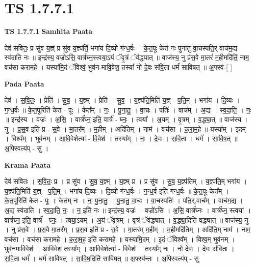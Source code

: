 \documentclass[17pt]{extarticle}
\begin{document}
\section*{ TS 1.7.7.1 }

\textbf{TS 1.7.7.1 } \newline
\textbf{Samhita Paata} \newline

देव॑ सवितः॒ प्र सु॑व य॒ज्ञ्ं प्र सु॑व य॒ज्ञ्प॑तिं॒ भगा॑य दि॒व्यो ग॑न्ध॒र्वः । के॒त॒पूः केतं॑ नः पुनातु वा॒चस्पति॒र् वाच॑म॒द्य स्व॑दाति नः ॥ इन्द्र॑स्य॒ वज्रो॑ऽसि॒ वार्त्र॑घ्न॒स्त्वया॒ऽयं ॅवृ॒त्रं ॅव॑द्ध्यात् ॥ वाज॑स्य॒ नु प्र॑स॒वे मा॒तरं॑ म॒हीमदि॑तिं॒ नाम॒ वच॑सा करामहे । यस्या॑मि॒दं ॅविश्वं॒ भुव॑न-मावि॒वेश॒ तस्यां᳚ नो दे॒वः स॑वि॒ता धर्म॑ साविषत् ॥ अ॒फ्स्व॑-[ ] \newline

\textbf{Pada Paata} \newline

देव॑ । स॒वि॒तः॒ । प्रेति॑ । सु॒व॒ । य॒ज्ञ्म् । प्रेति॑ । सु॒व॒ । य॒ज्ञ्प॑ति॒मिति॑ य॒ज्ञ् - प॒ति॒म् । भगा॑य । दि॒व्यः । ग॒न्ध॒र्वः ॥ के॒त॒पूरिति॑ केत - पूः । केत᳚म् । नः॒ । पु॒ना॒तु॒ । वा॒चः । पतिः॑ । वाच᳚म् । अ॒द्य । स्व॒दा॒ति॒ । नः॒ ॥ इन्द्र॑स्य । वज्रः॑ । अ॒सि॒ । वार्त्र॑घ्न॒ इति॒ वार्त्र॑ - घ्नः॒ । त्वया᳚ । अ॒यम् । वृ॒त्रम् । व॒द्ध्या॒त् ॥ वाज॑स्य । नु । प्र॒स॒व इति॑ प्र - स॒वे । मा॒तर᳚म् । म॒हीम् । अदि॑तिम् । नाम॑ । वच॑सा । क॒रा॒म॒हे॒ ॥ यस्या᳚म् । इ॒दम् । विश्व᳚म् । भुव॑नम् । आ॒वि॒वेशेत्या᳚ - वि॒वेश॑ । तस्या᳚म् । नः॒ । दे॒वः । स॒वि॒ता । धर्म॑ । सा॒वि॒ष॒त् ॥ अ॒फ्स्वित्य॑प् - सु ।  \newline


\textbf{Krama Paata} \newline

देव॑ सवितः । स॒वि॒तः॒ प्र । प्र सु॑व । सु॒व॒ य॒ज्ञ्म् । य॒ज्ञ्म् प्र । प्र सु॑व । सु॒व॒ य॒ज्ञ्प॑तिम् । य॒ज्ञ्प॑ति॒म् भगा॑य । य॒ज्ञ्प॑ति॒मिति॑ य॒ज्ञ् - प॒ति॒म् । भगा॑य दि॒व्यः । दि॒व्यो ग॑न्ध॒र्वः । ग॒न्ध॒र्व इति॑ गन्ध॒र्वः ॥ के॒त॒पूः केत᳚म् । के॒त॒पूरिति॑ केत - पूः । केत॑म् नः । नः॒ पु॒ना॒तु॒ । पु॒ना॒तु॒ वा॒चः । वा॒चस्पतिः॑ । पति॒र्,वाच᳚म् । वाच॑म॒द्य । अ॒द्य स्व॑दाति । स्व॒दा॒ति॒ नः॒ । न॒ इति॑ नः ॥ इन्द्र॑स्य॒ वज्रः॑ । वज्रो॑ऽसि । अ॒सि॒ वार्त्र॑घ्नः । वार्त्र॑घ्न॒ स्त्वया᳚ । वार्त्र॑घ्न॒ इति॒ वार्त्र॑ - घ्नः॒ । त्वया॒ऽयम् । अ॒यं ॅवृ॒त्रम् । वृ॒त्रं ॅव॑द्ध्यात् । व॒द्ध्या॒दिति॑ वद्ध्यात् ॥ वाज॑स्य॒ नु । नु प्र॑स॒वे । प्र॒स॒वे मा॒तर᳚म् । प्र॒स॒व इति॑ प्र - स॒वे । मा॒तर॑म् म॒हीम् । म॒हीमदि॑तिम् । अदि॑ति॒म् नाम॑ । नाम॒ वच॑सा । वच॑सा करामहे । क॒रा॒म॒ह॒ इति॑ करामहे ॥ यस्या॑मि॒दम् । इ॒दं ॅविश्व᳚म् । विश्व॒म् भुव॑नम् । भुव॑नमावि॒वेश॑ । आ॒वि॒वेश॒ तस्या᳚म् । आ॒वि॒वेशेत्या᳚ - वि॒वेश॑ । तस्या᳚म् नः । नो॒ दे॒वः । दे॒वः स॑वि॒ता । स॒वि॒ता धर्म॑ । धर्म॑ साविषत् । सा॒वि॒ष॒दिति॑ साविषत् ॥ अ॒फ्स्व॑न्तः । अ॒फ्स्वित्य॑प् - सु \newline
\end{document}
